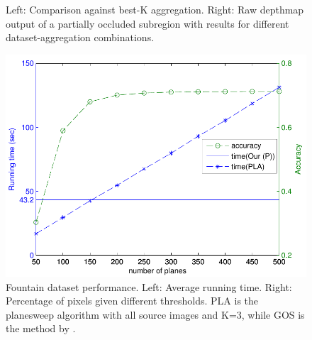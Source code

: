 \begin{figure}
\centering
{}
\caption[Comparison against the best-K planesweeping method in accuracy given different $K$.]{Left: Comparison against best-K aggregation. Right: Raw depthmap output of a partially occluded subregion with results for different dataset-aggregation combinations.}
\label{fig:bestK}
\end{figure}

\begin{figure}
\centering
\includegraphics[width=0.7\linewidth]{chapter3/resource/planesweepTiming.pdf}
\caption[Comparison against the best-K planesweeping method in accuracy and run time given different number of planes.]{Fountain dataset performance. Left: Average running time. Right: Percentage of pixels given different thresholds.  PLA is the planesweep algorithm with all source images and K=3, while GOS is the method by \citet{Goesele07}.}
\label{fig:timing}
\end{figure}


